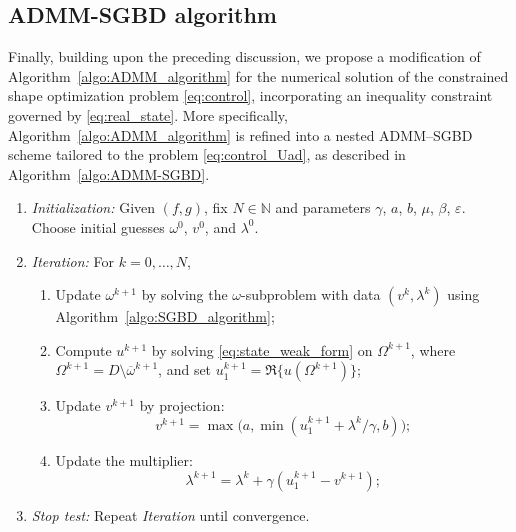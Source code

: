 \documentclass[a4paper,11pt]{article}
\newtheorem{remark}{Remark}
\newcommand{\ur}{u_{1}}
\newcommand{\ADMMpara}{\gamma}
\begin{document}
\subsection{ADMM-SGBD algorithm}
Finally, building upon the preceding discussion, we propose a modification of Algorithm~\ref{algo:ADMM_algorithm} for the numerical solution of the constrained shape optimization problem \eqref{eq:control}, incorporating an inequality constraint governed by \eqref{eq:real_state}. 
More specifically, Algorithm~\ref{algo:ADMM_algorithm} is refined into a nested ADMM--SGBD scheme tailored to the problem \eqref{eq:control_Uad}, as described in Algorithm~\ref{algo:ADMM-SGBD}.
\begin{algorithm}[!htp] 
\caption{ADMM--SGBD}\label{algo:ADMM-SGBD}
\begin{enumerate} \itemsep0.1em 
\item \textit{Initialization:} Given $(f,g)$, fix $N \in \mathbb{N}$ and parameters $\ADMMpara$, $a$, $b$, $\mu$, $\beta$, $\varepsilon$. Choose initial guesses $\omega^{0}$, $v^{0}$, and $\lambda^{0}$.

\item \textit{Iteration:} For $k=0,\ldots,N$,
\begin{enumerate}\itemsep0.1em
\item[2.1] Update $\omega^{k+1}$ by solving the $\omega$-subproblem with data $(v^k,\lambda^k)$ using Algorithm~\ref{algo:SGBD_algorithm};
\item[2.2] Compute $u^{k+1}$ by solving \eqref{eq:state_weak_form} on $\varOmega^{k+1}$, where $\varOmega^{k+1} = D \setminus \overline{\omega}^{k+1}$, and set $\ur^{k+1}=\Re\{u(\varOmega^{k+1})\}$;
\item[2.3] Update $v^{k+1}$ by projection:
\[
v^{k+1}=\max \big( a, \min (\ur^{k+1}+\lambda^{k}/\ADMMpara, b ) \big);
\]
\item[2.4] Update the multiplier:
\[
\lambda^{k+1}=\lambda^{k}+\ADMMpara (\ur^{k+1}-v^{k+1});
\]
\end{enumerate}

\item \textit{Stop test:} Repeat \textit{Iteration} until convergence.
\end{enumerate}
\end{algorithm}
%
%
%
\end{document}
